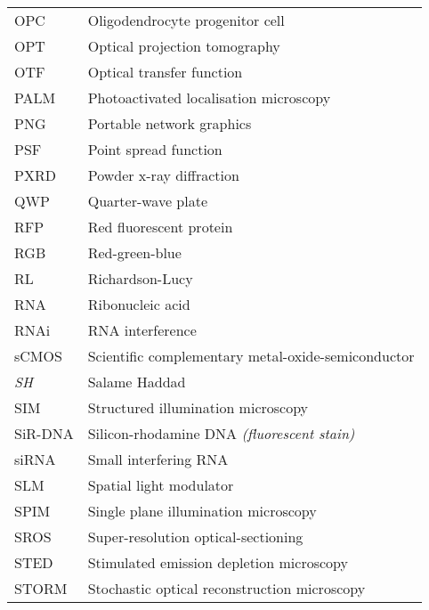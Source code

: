 \begin{flushleft}
\begin{longtable}[l]{|p{5.5em}|p{25em}|}
OPC        & Oligodendrocyte progenitor cell                            \\
OPT        & Optical projection tomography                              \\
OTF        & Optical transfer function                                  \\
PALM       & Photoactivated localisation microscopy                     \\
PNG        & Portable network graphics                                  \\
PSF        & Point spread function                                      \\
PXRD       & Powder x-ray diffraction                                   \\
QWP        & Quarter-wave plate                                         \\
RFP        & Red fluorescent protein                                    \\
RGB        & Red-green-blue                                             \\
RL         & Richardson-Lucy                                            \\
RNA        & Ribonucleic acid                                           \\
RNAi       & RNA interference                                           \\
sCMOS      & Scientific complementary metal-oxide-semiconductor         \\
\textit{SH} & Salame Haddad                                              \\
SIM        & Structured illumination microscopy                         \\
SiR-DNA    & Silicon-rhodamine DNA \textit{(fluorescent stain)}                  \\
siRNA      & Small interfering RNA                                      \\
SLM        & Spatial light modulator                                    \\
SPIM       & Single plane illumination microscopy                       \\
SROS       & Super-resolution optical-sectioning                        \\
STED       & Stimulated emission depletion microscopy                   \\
STORM      & Stochastic optical reconstruction microscopy              \\

\end{longtable}
\end{flushleft}
